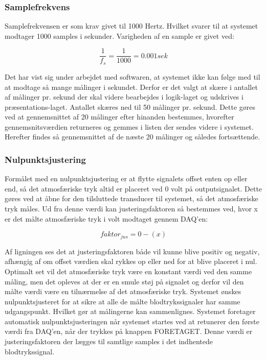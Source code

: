 \subsubsection{Samplefrekvens}
Samplefrekvensen er som krav givet til 1000 Hertz. Hvilket svarer til at systemet modtager 1000 samples i sekunder. Varigheden af en sample er givet ved: 
\begin{ceqn}
\begin{equation}
\frac{1}{f_s}=\frac{1}{1000}=0.001 sek
\end{equation}
\end{ceqn}
Det har vist sig under arbejdet med softwaren, at systemet ikke kan følge med til at modtage så mange målinger i sekundet. Derfor er det valgt at skære i antallet af målinger pr. sekund der skal videre bearbejdes i logik-laget og udskrives i præsentations-laget. Antallet skæres ned til 50 målinger pr. sekund. Dette gøres ved at gennemsnittet af 20 målinger efter hinanden bestemmes, hvorefter gennemsnitsværdien returneres og gemmes i listen der sendes videre i systemet. Herefter findes så gennemsnittet af de næste 20 målinger og således fortsættende.   

\subsubsection{Nulpunktsjustering}
Formålet med en nulpunktsjustering er at flytte signalets offset enten op eller end, så det atmosfæriske tryk altid er placeret ved 0 volt på outputsignalet. Dette gøres ved at åbne for den tilsluttede transducer til systemet, så det atmosfæriske tryk måles. Ud fra denne værdi kan justeringsfaktoren så bestemmes ved, hvor x er det målte atmosfæriske tryk i volt modtaget gennem DAQ’en:
\begin{ceqn}
\begin{equation}
faktor_{jus}=0-(x)
\end{equation}
\end{ceqn}
Af ligningen ses det at justeringsfaktoren både vil kunne blive positiv og negativ, afhængig af om offset værdien skal rykkes op eller ned for at blive placeret i nul. Optimalt set vil det atmosfæriske tryk være en konstant værdi ved den samme måling, men det opleves at der er en smule støj på signalet og derfor vil den målte værdi være en tilnærmelse af det atmosfæriske tryk. Systemet ønskes nulpunktsjusteret for at sikre at alle de målte blodtrykssignaler har samme udgangspunkt. Hvilket gør at målingerne kan sammenlignes. Systemet foretager automatisk nulpunktsjusteringen når systemet startes ved at retunerer den første værdi fra DAQ'en, når der trykkes på knappen FORETAGET. Denne værdi er justeringsfaktoren der lægges til samtlige samples i det indhentede blodtrykssignal.

